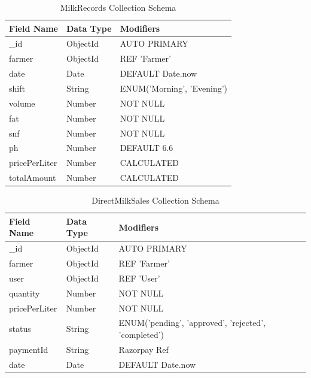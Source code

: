 \documentclass[12pt,a4paper]{report}
\begin{document}
\vspace{0.4cm}
\begin{table}[htbp]
\centering
\begin{tabular}{|p{4cm}|p{3cm}|p{8cm}|}
\hline
\textbf{Field Name} & \textbf{Data Type} & \textbf{Modifiers} \\ \hline
\_id & ObjectId & AUTO PRIMARY \\ \hline
farmer & ObjectId & REF 'Farmer' \\ \hline
date & Date & DEFAULT Date.now \\ \hline
shift & String & ENUM('Morning', 'Evening') \\ \hline
volume & Number & NOT NULL \\ \hline
fat & Number & NOT NULL \\ \hline
snf & Number & NOT NULL \\ \hline
ph & Number & DEFAULT 6.6 \\ \hline
pricePerLiter & Number & CALCULATED \\ \hline
totalAmount & Number & CALCULATED \\ \hline
\end{tabular}
\caption{MilkRecords Collection Schema}
\end{table}
\vspace{0.4cm}

\vspace{0.4cm}
\begin{table}[htbp]
\centering
\begin{tabular}{|p{4cm}|p{3cm}|p{8cm}|}
\hline
\textbf{Field Name} & \textbf{Data Type} & \textbf{Modifiers} \\ \hline
\_id & ObjectId & AUTO PRIMARY \\ \hline
farmer & ObjectId & REF 'Farmer' \\ \hline
user & ObjectId & REF 'User' \\ \hline
quantity & Number & NOT NULL \\ \hline
pricePerLiter & Number & NOT NULL \\ \hline
status & String & ENUM('pending', 'approved', 'rejected', 'completed') \\ \hline
paymentId & String & Razorpay Ref \\ \hline
date & Date & DEFAULT Date.now \\ \hline
\end{tabular}
\caption{DirectMilkSales Collection Schema}
\end{table}
\vspace{0.4cm}
\end{document}
